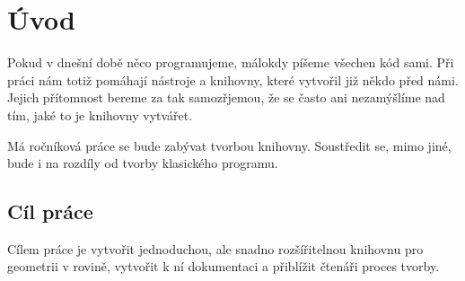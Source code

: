 \chapter{Úvod}
\label{chap:introduction}

Pokud v dnešní době něco programujeme, málokdy píšeme všechen kód sami. 
Při práci nám totiž pomáhají nástroje a knihovny, které vytvořil již někdo před námi.
Jejich přítomnost bereme za tak samozřjemou, že se často ani nezamýšlíme nad tím, jaké to je knihovny vytvářet.  

Má ročníková práce se bude zabývat tvorbou knihovny. Soustředit se, mimo jiné, bude i na rozdíly od tvorby klasického programu.

\section{Cíl práce}
\label{sec:goal}

Cílem práce je vytvořit jednoduchou, ale snadno rozšířitelnou knihovnu pro geometrii v rovině, vytvořit k ní dokumentaci a přiblížit čtenáři proces tvorby. 